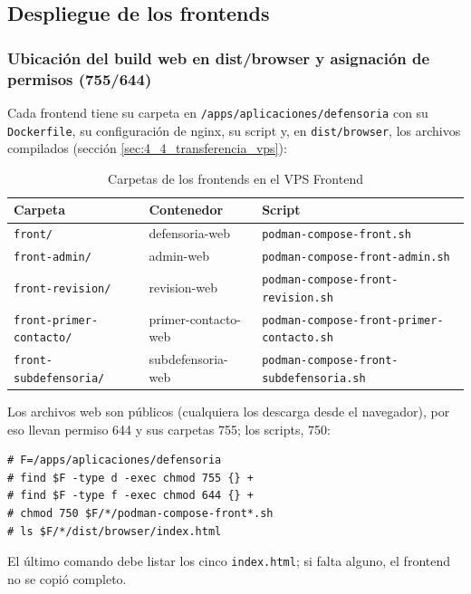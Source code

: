 \subsection{Despliegue de los frontends}\label{sec:7_2_frontends}

\subsubsection{Ubicación del build web en dist/browser y asignación de permisos (755/644)}
Cada frontend tiene su carpeta en \nolinkurl{/apps/aplicaciones/defensoria} con su \texttt{Dockerfile}, su configuración de nginx, su script y, en \texttt{dist/browser}, los archivos compilados (sección \ref{sec:4_4_transferencia_vps}):
\begin{table}[H]
\centering
\caption{Carpetas de los frontends en el VPS Frontend}
\footnotesize
\begin{tabular}{p{4.4cm}p{3.6cm}p{6.4cm}}
\toprule
\textbf{Carpeta} & \textbf{Contenedor} & \textbf{Script} \\
\midrule
\texttt{front/} & defensoria-web & \nolinkurl{podman-compose-front.sh} \\
\texttt{front-admin/} & admin-web & \nolinkurl{podman-compose-front-admin.sh} \\
\texttt{front-revision/} & revision-web & \nolinkurl{podman-compose-front-revision.sh} \\
\texttt{front-primer-contacto/} & primer-contacto-web & \nolinkurl{podman-compose-front-primer-contacto.sh} \\
\texttt{front-subdefensoria/} & subdefensoria-web & \nolinkurl{podman-compose-front-subdefensoria.sh} \\
\bottomrule
\end{tabular}
\end{table}
Los archivos web son públicos (cualquiera los descarga desde el navegador), por eso llevan permiso 644 y sus carpetas 755; los scripts, 750:
\begin{lstlisting}
# F=/apps/aplicaciones/defensoria
# find $F -type d -exec chmod 755 {} +
# find $F -type f -exec chmod 644 {} +
# chmod 750 $F/*/podman-compose-front*.sh
# ls $F/*/dist/browser/index.html
\end{lstlisting}
El último comando debe listar los cinco \texttt{index.html}; si falta alguno, el frontend no se copió completo.

